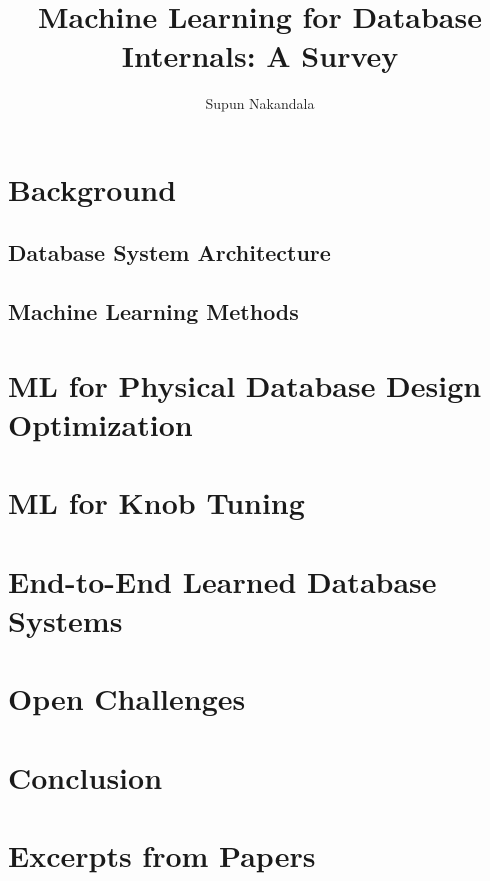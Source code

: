\documentclass[acmsmall]{acmart}
\newcommand{\titlename}{Machine Learning for Database Internals: A Survey}
\begin{document}
\sloppy
\title{\titlename}


\author{Supun Nakandala}

\maketitle
\begin{abstract}
\end{abstract}



\section{Background}
\subsection{Database System Architecture}
\subsection{Machine Learning Methods}



\section{ML for Physical Database Design Optimization}

\section{ML for Knob Tuning}



\section{End-to-End Learned Database Systems}

\section{Open Challenges}

\section{Conclusion}




\section{Excerpts from Papers}
\end{document}
